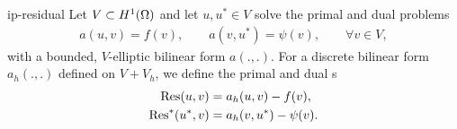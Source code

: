 \begin{Definition}{ip-residual}
  Let $V\subset H^1(\Omega)$ and let $u,u^*\in V$ solve the primal
  and dual problems
  \begin{gather}
    a(u,v) = f(v),
    \qquad
    a(v,u^*) = \psi(v),
    \qquad
    \forall v\in V,
  \end{gather}
  with a bounded, $V$-elliptic bilinear form $a(.,.)$. For a discrete
  bilinear form $a_h(.,.)$ defined on $V+V_h$, we define the primal
  and dual s
  \begin{gather}
    \label{eq:ip-lifting:8}
    \begin{split}
      \operatorname{Res}(u,v) &= a_h(u,v) - f(v), \\
      \operatorname{Res}^*(u^*,v) &= a_h(v,u^*) - \psi(v).
    \end{split}
  \end{gather}
\end{Definition}


